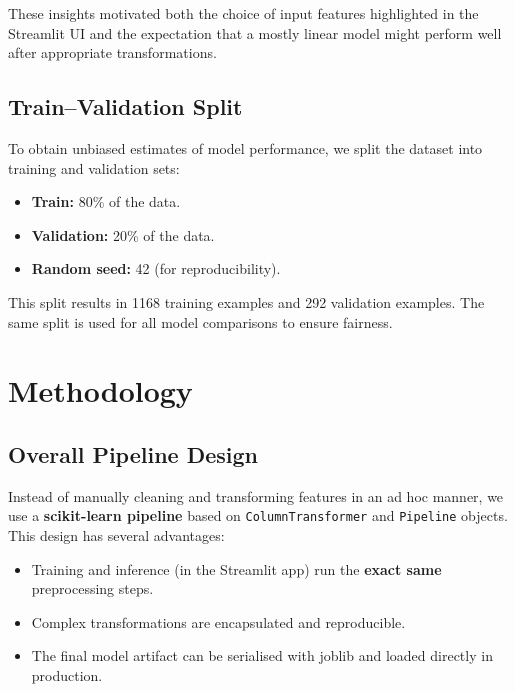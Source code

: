 \documentclass[11pt,a4paper]{article}
\begin{document}
These insights motivated both the choice of input features highlighted in the Streamlit UI and the expectation that a mostly linear model might perform well after appropriate transformations.

\subsection{Train--Validation Split}

To obtain unbiased estimates of model performance, we split the dataset into training and validation sets:

\begin{itemize}[leftmargin=*]
    \item \textbf{Train:} 80\% of the data.
    \item \textbf{Validation:} 20\% of the data.
    \item \textbf{Random seed:} 42 (for reproducibility).
\end{itemize}

This split results in 1168 training examples and 292 validation examples.
The same split is used for all model comparisons to ensure fairness.

\section{Methodology}

\subsection{Overall Pipeline Design}

Instead of manually cleaning and transforming features in an ad hoc manner, we use a \textbf{scikit-learn pipeline} based on \texttt{ColumnTransformer} and \texttt{Pipeline} objects.
This design has several advantages:

\begin{itemize}[leftmargin=*]
    \item Training and inference (in the Streamlit app) run the \textbf{exact same} preprocessing steps.
    \item Complex transformations are encapsulated and reproducible.
    \item The final model artifact can be serialised with joblib and loaded directly in production.
\end{itemize}
\end{document}
